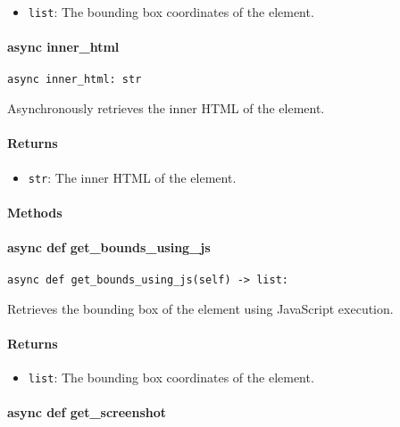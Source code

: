 \documentclass{article}
\begin{document}
\begin{itemize}
    \item \lstinline[style=pythonstyle]|list|: The bounding box coordinates of the element.
\end{itemize}

\paragraph{async inner\_html}

\begin{lstlisting}[style=pythonstyle]
async inner_html: str
\end{lstlisting}

\noindent Asynchronously retrieves the inner HTML of the element.

\paragraph{Returns}

\begin{itemize}
    \item \lstinline[style=pythonstyle]|str|: The inner HTML of the element.
\end{itemize}

\paragraph{Methods}
\paragraph{async def get\_bounds\_using\_js}

\begin{lstlisting}[style=pythonstyle]
async def get_bounds_using_js(self) -> list:
\end{lstlisting}

\noindent Retrieves the bounding box of the element using JavaScript execution.

\paragraph{Returns}

\begin{itemize}
    \item \lstinline[style=pythonstyle]|list|: The bounding box coordinates of the element.
\end{itemize}

\paragraph{async def get\_screenshot}
\end{document}
